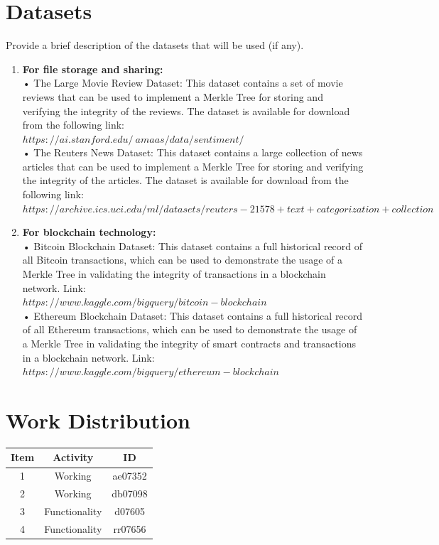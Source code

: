 \documentclass{article}
\begin{document}
\section{Datasets}
Provide a brief description of the datasets that will be used (if any).
    \begin{enumerate}
     \item \textbf{For file storage and sharing:}\\ •	The Large Movie Review Dataset: This dataset contains a set of movie reviews that can be used to implement a Merkle Tree for storing and verifying the integrity of the reviews. The dataset is available for download from the following link: \\$https://ai.stanford.edu/~amaas/data/sentiment/$  \\
        •	The Reuters News Dataset: This dataset contains a large collection of news articles that can be used to implement a Merkle Tree for storing and verifying the integrity of the articles. The dataset is available for download from the following link: \\$https://archive.ics.uci.edu/ml/datasets/reuters-21578+text+categorization+collection$ 
        
        \item \textbf{For blockchain technology:} \\ •	Bitcoin Blockchain Dataset: This dataset contains a full historical record of all Bitcoin transactions, which can be used to demonstrate the usage of a Merkle Tree in validating the integrity of transactions in a blockchain network. Link: \\$https://www.kaggle.com/bigquery/bitcoin-blockchain$
        \\•	Ethereum Blockchain Dataset: This dataset contains a full historical record of all Ethereum transactions, which can be used to demonstrate the usage of a Merkle Tree in validating the integrity of smart contracts and transactions in a blockchain network. Link: \\$https://www.kaggle.com/bigquery/ethereum-blockchain$ 
        
\end{enumerate}

\newpage
\section{Work Distribution}
\begin{center}
  \begin{table}[h]
    \centering
    \begin{tabular}{|c|c|c|}
      \hline
      Item & Activity   & ID      \\ \hline
      1    & Working & ae07352 \\ \hline
      2    & Working & db07098 \\ \hline
      3    & Functionality & d07605 \\ \hline
      4    & Functionality & rr07656 \\ \hline
    \end{tabular}

    \label{tab:my-table6}
  \end{table}
\end{center}
\end{document}
